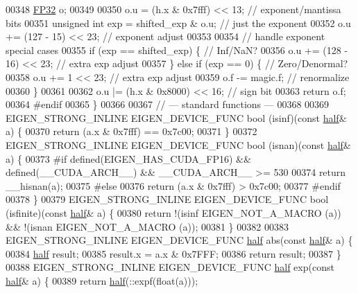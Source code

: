 \begin{DoxyCode}
00348   \hyperlink{union_eigen_1_1half__impl_1_1_f_p32}{FP32} o;
00349 
00350   o.u = (h.x & 0x7fff) << 13;             \textcolor{comment}{// exponent/mantissa bits}
00351   \textcolor{keywordtype}{unsigned} \textcolor{keywordtype}{int} exp = shifted\_exp & o.u;   \textcolor{comment}{// just the exponent}
00352   o.u += (127 - 15) << 23;                \textcolor{comment}{// exponent adjust}
00353 
00354   \textcolor{comment}{// handle exponent special cases}
00355   \textcolor{keywordflow}{if} (exp == shifted\_exp) \{     \textcolor{comment}{// Inf/NaN?}
00356     o.u += (128 - 16) << 23;    \textcolor{comment}{// extra exp adjust}
00357   \} \textcolor{keywordflow}{else} \textcolor{keywordflow}{if} (exp == 0) \{        \textcolor{comment}{// Zero/Denormal?}
00358     o.u += 1 << 23;             \textcolor{comment}{// extra exp adjust}
00359     o.f -= magic.f;             \textcolor{comment}{// renormalize}
00360   \}
00361 
00362   o.u |= (h.x & 0x8000) << 16;    \textcolor{comment}{// sign bit}
00363   \textcolor{keywordflow}{return} o.f;
00364 \textcolor{preprocessor}{#endif}
00365 \}
00366 
00367 \textcolor{comment}{// --- standard functions ---}
00368 
00369 EIGEN\_STRONG\_INLINE EIGEN\_DEVICE\_FUNC bool (isinf)(\textcolor{keyword}{const} \hyperlink{struct_eigen_1_1half}{half}& a) \{
00370   \textcolor{keywordflow}{return} (a.x & 0x7fff) == 0x7c00;
00371 \}
00372 EIGEN\_STRONG\_INLINE EIGEN\_DEVICE\_FUNC bool (isnan)(\textcolor{keyword}{const} \hyperlink{struct_eigen_1_1half}{half}& a) \{
00373 \textcolor{preprocessor}{#if defined(EIGEN\_HAS\_CUDA\_FP16) && defined(\_\_CUDA\_ARCH\_\_) && \_\_CUDA\_ARCH\_\_ >= 530}
00374   \textcolor{keywordflow}{return} \_\_hisnan(a);
00375 \textcolor{preprocessor}{#else}
00376   \textcolor{keywordflow}{return} (a.x & 0x7fff) > 0x7c00;
00377 \textcolor{preprocessor}{#endif}
00378 \}
00379 EIGEN\_STRONG\_INLINE EIGEN\_DEVICE\_FUNC bool (isfinite)(\textcolor{keyword}{const} \hyperlink{struct_eigen_1_1half}{half}& a) \{
00380   \textcolor{keywordflow}{return} !(isinf EIGEN\_NOT\_A\_MACRO (a)) && !(isnan EIGEN\_NOT\_A\_MACRO (a));
00381 \}
00382 
00383 EIGEN\_STRONG\_INLINE EIGEN\_DEVICE\_FUNC \hyperlink{struct_eigen_1_1half}{half} abs(\textcolor{keyword}{const} \hyperlink{struct_eigen_1_1half}{half}& a) \{
00384   \hyperlink{struct_eigen_1_1half}{half} result;
00385   result.x = a.x & 0x7FFF;
00386   \textcolor{keywordflow}{return} result;
00387 \}
00388 EIGEN\_STRONG\_INLINE EIGEN\_DEVICE\_FUNC \hyperlink{struct_eigen_1_1half}{half} exp(\textcolor{keyword}{const} \hyperlink{struct_eigen_1_1half}{half}& a) \{
00389   \textcolor{keywordflow}{return} \hyperlink{struct_eigen_1_1half}{half}(::expf(\textcolor{keywordtype}{float}(a)));

\end{DoxyCode}
